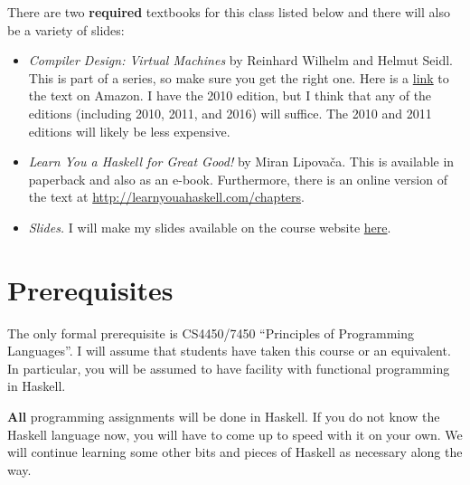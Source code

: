 \documentclass[11pt]{article}
\begin{document}
There are two {\bf{required}} textbooks for this class listed below and there will also be a variety of slides:
\begin{itemize}

\item {\it Compiler Design: Virtual Machines} by Reinhard Wilhelm and Helmut Seidl. This is part of a series, so make sure you get the right one.
Here is a \href{https://www.amazon.com/Compiler-Design-Machines-Reinhard-Wilhelm/dp/3642149081/ref=sr_1_1?s=books&ie=UTF8&qid=1548255410&sr=1-1}{link} to the text on Amazon.
I have the 2010 edition, but I think that any of the editions (including 2010, 2011, and 2016) will suffice. The 2010 and 2011 editions will likely be less expensive.


\item {\it Learn You a Haskell for Great Good!} by Miran Lipova\v{c}a. This is available in  paperback and also as an e-book. Furthermore,  there is an online version of the text at \url{http://learnyouahaskell.com/chapters}. 

\item {\it Slides.} I will make my slides available on the course website \href{https://harrisonwl.github.io/doc/4430.html}{here}. 
\end{itemize}

\section{Prerequisites}

The only formal prerequisite is CS4450/7450 ``Principles of Programming Languages''. I will assume that students have taken this course or an equivalent.
In particular, you will be assumed to have facility with functional programming in Haskell.

{\bf All} programming assignments will be done in Haskell. If you do not know the Haskell language now, you will have to come up to speed with it on your own. We will continue learning some other bits and pieces of Haskell as necessary along the way.


%
\end{document}
